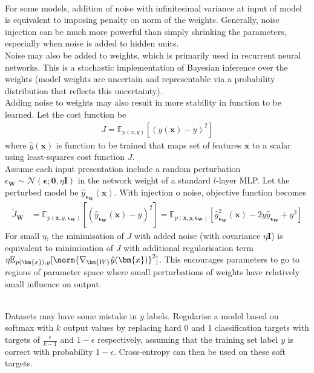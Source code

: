 \begin{remark} \\
For some models, addition of noise with infinitesimal variance at input of model is equivalent to imposing penalty on norm of the weights. Generally, noise injection can be much more powerful than simply shrinking the parameters, especially when noise is added to hidden units.\\
Noise may also be added to weights, which is primarily used in recurrent neural networks. This is a stochastic implementation of Bayesian inference over the weights (model weights are uncertain and representable via a probability distribution that reflects this uncertainty).\\
Adding noise to weights may also result in more stability in function to be learned. Let the cost function be 
\begin{align}
J = \mathbb{E}_{p(x,y)}[(\hat{y}(\bm{x}) - y)^2] \nonumber
\end{align}
where $\hat{y}(\bm{x})$ is function to be trained that maps set of features $\bm{x}$ to a scalar using least-squares cost function $J$.\\
Assume each input presentation include a random perturbation $\epsilon_{\bm{W}} \sim \mathcal{N}(\bm{\epsilon}; \bm{0}, \eta \bm{I})$ in the network weight of a standard $l$-layer MLP. Let the perturbed model be $\hat{y}_{\bm{\epsilon}_{\bm{W}}}(\bm{x})$. With injection o noise, objective function becomes
\begin{align}
\tilde{J}_{\bm{W}} &= \mathbb{E}_{p(\bm{x}, y, \bm{\epsilon}_{\bm{W}})}\left[(\hat{y}_{\bm{\epsilon}_{\bm{W}}}(\bm{x}) - y)^2 \right] = \mathbb{E}_{p(\bm{x}, y, \bm{\epsilon}_{\bm{W}})} \left[\hat{y}^2_{\bm{\epsilon}_{\bm{W}}}(\bm{x}) - 2 y \hat{y}_{\bm{\epsilon}_{\bm{W}}} + y^2 \right] \nonumber
\end{align}
For small $\eta$, the minimisation of $J$ with added noise (with covariance $\eta \bm{I}$) is equivalent to minimisation of $J$ with additional regularisation term $\eta \mathbb{E}_{p(\bm{x}), y} [\norm{\nabla_{\bm{W}} \hat{y}(\bm{x})}^2]$. This encourages parameters to go to regions of parameter space where small perturbations of weights have relatively small influence on output.
\end{remark}

\begin{remark} \\
Datasets may have some mistake in $y$ labels. Regularise a model based on softmax with $k$ output values by replacing hard $0$ and $1$ classification targets with targets of $\frac{\epsilon}{k-1}$ and $1-\epsilon$ respectively, assuming that the training set label $y$ is correct with probability $1- \epsilon$. Cross-entropy can then be used on these soft targets.
\end{remark}

